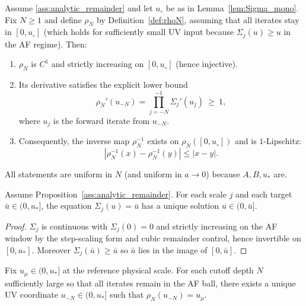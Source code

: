 \begin{theorem}\label{thm:rho_inj}
Assume \ref{ass:analytic_remainder} and let $u_\circ$ be as in Lemma~\ref{lem:Sigma_mono}.
Fix $N\ge 1$ and define $\rho_N$ by Definition~\ref{def:rhoN}, assuming that all iterates stay in $[0,u_\circ]$
(which holds for sufficiently small UV input because $\Sigma_j(u)\ge u$ in the AF regime).
Then:
\begin{enumerate}[label=(\alph*)]
\item $\rho_N$ is $C^1$ and strictly increasing on $[0,u_\circ]$ (hence injective).
\item Its derivative satisfies the explicit lower bound
\begin{equation}\label{eq:rho_deriv}
\rho_N'(u_{-N})=\prod_{j=-N}^{-1}\Sigma_j'(u_j)\ \ge\ 1,
\end{equation}
where $u_j$ is the forward iterate from $u_{-N}$.
\item Consequently, the inverse map $\rho_N^{-1}$ exists on $\rho_N([0,u_\circ])$ and is $1$-Lipschitz:
\begin{equation}\label{eq:inverse_lip}
|\rho_N^{-1}(x)-\rho_N^{-1}(y)|\le |x-y|.
\end{equation}
\end{enumerate}
All statements are uniform in $N$ (and uniform in $a\to 0$) because $A,B,u_\ast$ are.
\end{theorem}

\begin{lemma}\label{lem:Sigma_backward}
Assume Proposition~\ref{ass:analytic_remainder}.
For each scale $j$ and each target $\bar u\in(0,u_\ast]$, the equation $\Sigma_j(u)=\bar u$ has a unique solution $u\in(0,\bar u]$.
\end{lemma}
\begin{proof}
$\Sigma_j$ is continuous with $\Sigma_j(0)=0$ and strictly increasing on the AF window by the step-scaling form and cubic remainder control, hence invertible on $[0,u_\ast]$.
Moreover $\Sigma_j(\bar u)\ge \bar u$ so $\bar u$ lies in the image of $[0,\bar u]$.
\end{proof}

\begin{corollary}\label{cor:C3_tuning_exists}
Fix $u_\mu\in(0,u_\ast]$ at the reference physical scale.
For each cutoff depth $N$ sufficiently large so that all iterates remain in the AF ball, there exists a unique UV coordinate $u_{-N}\in(0,u_\ast]$ such that $\rho_N(u_{-N})=u_\mu$.
\end{corollary}


